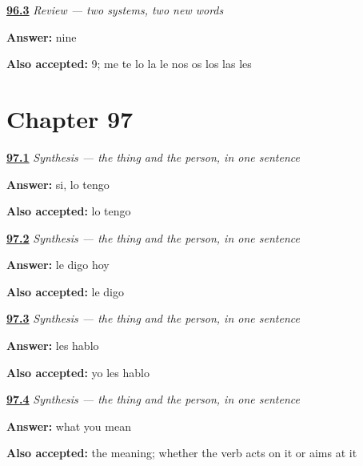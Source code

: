 \noindent\begin{minipage}[t]{\linewidth}
\raggedright
\hyperlink{review-ES-C46-repaso-dos-sistemas-count}{\textbf{96.3}} \emph{Review — two systems, two new words}\par
\small \textbf{Answer:} nine\par
\footnotesize \textbf{Also accepted:} 9; me te lo la le nos os los las les
\end{minipage}\par\medskip

\section*{Chapter 97}

\noindent\begin{minipage}[t]{\linewidth}
\raggedright
\hyperlink{review-ES-C46-sintesis-dar-y-decir-book}{\textbf{97.1}} \emph{Synthesis — the thing and the person, in one sentence}\par
\small \textbf{Answer:} si, lo tengo\par
\footnotesize \textbf{Also accepted:} lo tengo
\end{minipage}\par\medskip

\noindent\begin{minipage}[t]{\linewidth}
\raggedright
\hyperlink{review-ES-C46-sintesis-dar-y-decir-person}{\textbf{97.2}} \emph{Synthesis — the thing and the person, in one sentence}\par
\small \textbf{Answer:} le digo hoy\par
\footnotesize \textbf{Also accepted:} le digo
\end{minipage}\par\medskip

\noindent\begin{minipage}[t]{\linewidth}
\raggedright
\hyperlink{review-ES-C46-sintesis-dar-y-decir-plural}{\textbf{97.3}} \emph{Synthesis — the thing and the person, in one sentence}\par
\small \textbf{Answer:} les hablo\par
\footnotesize \textbf{Also accepted:} yo les hablo
\end{minipage}\par\medskip

\noindent\begin{minipage}[t]{\linewidth}
\raggedright
\hyperlink{review-ES-C46-sintesis-dar-y-decir-what}{\textbf{97.4}} \emph{Synthesis — the thing and the person, in one sentence}\par
\small \textbf{Answer:} what you mean\par
\footnotesize \textbf{Also accepted:} the meaning; whether the verb acts on it or aims at it
\end{minipage}\par\medskip

